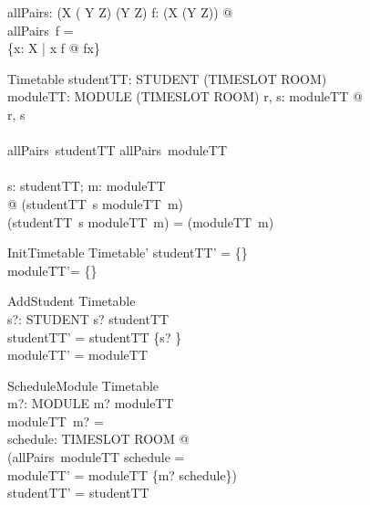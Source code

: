\documentclass{article}
\begin{document}
\begin{zed}
\end{zed}

\begin{gendef}[X, Y, Z]
allPairs: (X \pfun ( Y \rel Z) \fun (Y \rel Z)
\where
\forall f: (X \pfun (Y \rel Z)) @ \\
allPairs~f = \\ \bigcup \{x: X | x \in \dom f @ fx\}
\end{gendef}

\begin{schema}{Timetable}
studentTT: STUDENT \pfun (TIMESLOT \pfun ROOM)\\
moduleTT: MODULE \pfun (TIMESLOT \rel ROOM)
\where
\forall r, s: \ran moduleTT @ \\
\disjoint \langle r, s \rangle\\
{}\\
allPairs~studentTT \subseteq allPairs~moduleTT\\
{}\\
\forall s: \dom studentTT; 
m: \dom moduleTT\\
@ (studentTT~s \cap moduleTT~m) \neq \emptyset \implies\\
\dom (studentTT~s \cap moduleTT~m) = \dom (moduleTT~m)
\end{schema}

\begin{schema}{InitTimetable}
Timetable'
\where
studentTT' = \{\}\\
moduleTT'= \{\}
\end{schema}

\begin{schema}{AddStudent}
\Delta Timetable\\
s?: STUDENT
\where
s? \notin \dom studentTT\\
studentTT' = studentTT \cup \{s? \mapsto \emptyset\}\\
moduleTT' = moduleTT
\end{schema}

\begin{schema}{ScheduleModule}
\Delta Timetable\\
m?: MODULE
\where
m? \in \dom moduleTT\\
moduleTT~m? = \emptyset \\
\exists schedule: TIMESLOT \rel ROOM @ \\
(allPairs~moduleTT \cap schedule = \emptyset \\
\land moduleTT' = moduleTT \oplus \{m? \mapsto schedule\})\\
studentTT' = studentTT
\end{schema}
\end{document}
